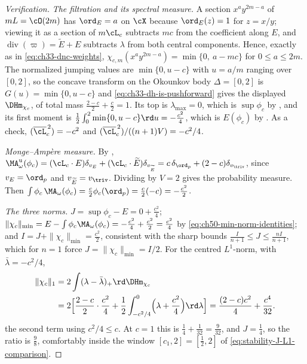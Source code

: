 \begin{proof}[Verification]
\emph{The filtration and its spectral measure.}  A section
$x^ay^{2m-a}$ of $mL=\cO(2m)$ has $\ord_E=a$ on $\cX$ because
$\ord_E(z)=1$ for $z=x/y$; viewing it as a section of
$m\cL_c$ subtracts $mc$ from the coefficient along $E$, and
$\operatorname{div}(\varpi)=\widetilde E+E$ subtracts $\lambda$ from
both central components.  Hence, exactly as in
\eqref{eq:ch33-dnc-weights},
$\chi_{c,m}(x^ay^{2m-a})=\min\{0,\ a-mc\}$ for $0\le a\le 2m$.  The
normalized jumping values are $\min\{0,u-c\}$ with $u=a/m$ ranging over
$[0,2]$, so the concave transform on the Okounkov body $\Delta=[0,2]$
is $G(u)=\min\{0,u-c\}$ and \eqref{eq:ch33-dh-is-pushforward} gives the
displayed $\DHm_{\chi_c}$, of total mass
$\frac{2-c}2+\frac c2=1$.  Its top is $\lambda_{\max}=0$, which is
$\sup\phi_c$ by , and its first moment is
$\frac12\int_0^2\min\{0,u-c\}\rd u=-\frac{c^2}4$, which is
$E(\phi_c)$ by .  As a check,
$(\overline\cL_c^{\,2})=-c^2$ and
$(\overline\cL_c^{\,2})/((n+1)V)=-c^2/4$.

\emph{Monge--Amp\`ere measure.}  By ,
$\MA^{\mathrm u}_\omega(\phi_c)=(\cL_c\cdot E)\delta_{v_E}
+(\cL_c\cdot\widetilde E)\delta_{v_{\widetilde E}}
=c\,\delta_{\ord_p}+(2-c)\delta_{v_{\triv}}$, since
$v_E=\ord_p$ and $v_{\widetilde E}=v_{\triv}$.  Dividing by $V=2$
gives the probability measure.  Then
$\int\phi_c\,\MA_\omega(\phi_c)=\frac c2\phi_c(\ord_p)
=\frac c2(-c)=-\frac{c^2}2$.

\emph{The three norms.}  $J=\sup\phi_c-E=0+\frac{c^2}4$;
$\|\chi_c\|_{\min}=E-\int\phi_c\MA_\omega(\phi_c)=-\frac{c^2}4+\frac{c^2}2
=\frac{c^2}4$ by \eqref{eq:ch50-min-norm-identities}; and
$I=J+\|\chi_c\|_{\min}=\frac{c^2}2$, consistent with the sharp bounds
$\frac{I}{n+1}\le J\le\frac{nI}{n+1}$, which for $n=1$ force
$J=\|\chi_c\|_{\min}=I/2$.  For the centred $L^1$-norm, with
$\bar\lambda=-c^2/4$,
\[
 \begin{aligned}
 \|\chi_c\|_1&=2\int(\lambda-\bar\lambda)_+\rd\DHm_{\chi_c}\\
 &=2\Bigl[\frac{2-c}2\cdot\frac{c^2}4
     +\frac12\int_{-c^2/4}^{0}\Bigl(\lambda+\frac{c^2}4\Bigr)\rd\lambda
     \Bigr]
 =\frac{(2-c)c^2}{4}+\frac{c^4}{32}.
 \end{aligned}
\]
the second term using $c^2/4\le c$.  At $c=1$ this is
$\frac14+\frac1{32}=\frac9{32}$, and $J=\frac14$, so the ratio is
$\frac9{8}$, comfortably inside the window
$[c_1,2]=[\frac12,2]$ of \eqref{eq:stability-J-L1-comparison}.


\end{proof}
